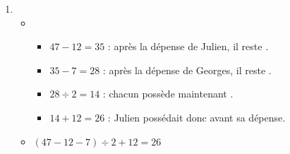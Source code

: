 {{\begin{enumerate}
\begin{itemize}
            \end{itemize}
            \item 
            \begin{itemize}
                \item \begin{itemize}
                    \item $47 - 12 = 35$ : après la dépense de Julien, il reste .
                    \item $35 - 7 = 28$ : après la dépense de Georges, il reste .
                    \item $28 \div 2 = 14$ : chacun possède maintenant .
                    \item $14 + 12 = 26$ : Julien possédait donc  avant sa dépense.
                \end{itemize}
                \item $(47 - 12 - 7) \div 2 + 12 = 26$
            \end{itemize}
        \end{enumerate}        
    }
}